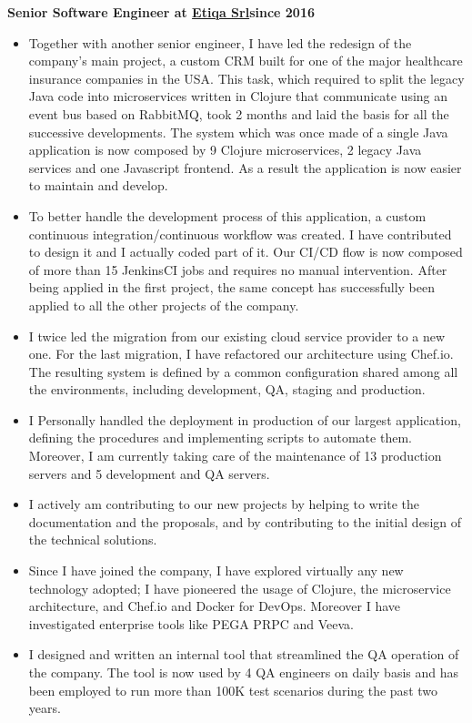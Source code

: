 \documentclass[a4paper,sans,10pt]{moderncv} %
\begin{document}
\textbf{Senior Software Engineer at \href{https://www.etiqa.it}{Etiqa Srl}}\hfill\textbf{since 2016}\\
\vspace{-1em}
  \begin{itemize}
  \item Together with another senior engineer, I have led the redesign of the company's main project,
  a custom CRM built for one of the major healthcare insurance companies in the USA.
  This task, which required to split the legacy Java code into microservices written in Clojure
  that communicate using an event bus based on RabbitMQ, took 2 months and laid the basis for all the successive developments.
  The system which was once made of a single Java application is now composed by
  9 Clojure microservices, 2 legacy Java services and one Javascript frontend.
  As a result the application is now easier to maintain and develop.
  \item To better handle the development process of this application,
  a custom continuous integration/continuous workflow was created.
  I have contributed to design it and I actually coded part of it.
  Our CI/CD flow is now composed of more than 15 JenkinsCI jobs and requires
  no manual intervention. After being applied in the first project, the same concept has successfully been applied to
  all the other projects of the company.
  \item I twice led the migration from our existing cloud service provider to a new one.
  For the last migration, I have refactored our architecture using Chef.io.
  The resulting system is defined by a common configuration shared among all the environments, including development, QA, staging and production.
  \item I Personally handled the deployment in production of our largest application, defining the procedures and implementing scripts to automate them.
  Moreover, I am currently taking care of the maintenance of 13 production servers and 5 development and QA servers.
  \item I actively am contributing to our new projects by helping to write the documentation and the proposals,
  and by contributing to the initial design of the technical solutions.
  \item Since I have joined the company, I have explored virtually any new technology adopted;
  I have pioneered the usage of Clojure, the microservice architecture, and Chef.io and Docker for DevOps.
  Moreover I have investigated enterprise tools like PEGA PRPC and Veeva.
  \item I designed and written an internal tool that streamlined the QA operation of the company.
  The tool is now used by 4 QA engineers on daily basis and has been employed to run more than 100K test scenarios
  during the past two years.
  \end{itemize}
\end{document}
